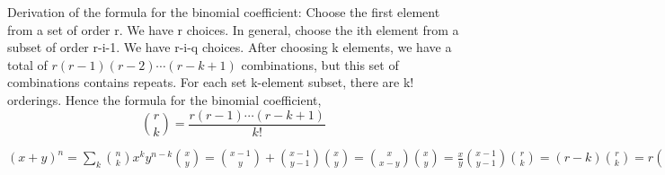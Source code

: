 \documentclass[11pt,a4paper]{article}
\begin{document}
Derivation of the formula for the binomial coefficient:
Choose the first element from a set of order r. We have r choices.
In general, choose the ith element from a subset of order r-i-1. We have r-i-q choices.
After choosing k elements, we have a total of $r(r-1)(r-2)\cdots(r-k+1)$ combinations, 
but this set of combinations contains repeats. For each set k-element subset, 
there are k! orderings. Hence the formula for the binomial coefficient,
$$
\binom{r}{k} = \frac{r(r-1)\cdots(r-k+1)}{k!} 
$$

\begin{math}
    (x+y)^n = \sum_{k} \binom{n}{k} x^k y^{n-k}
    \binom{x}{y} = \binom{x-1}{y} + \binom{x-1}{y-1}
    \binom{x}{y} = \binom{x}{x-y}
    \binom{x}{y} = \frac{x}{y} \binom{x-1}{y-1}
    \binom{r}{k} = 
    (r-k)\binom{r}{k} = r\binom{r-1}{k} = r\binom{r-1}{r-k-1}.
\end{math}
\end{document}

